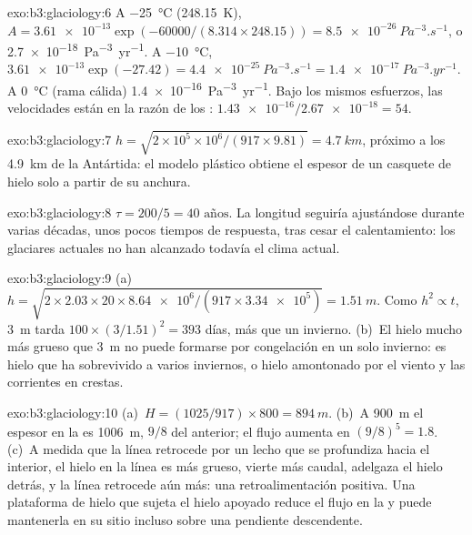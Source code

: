 \begin{solution}{exo:b3:glaciology:6}
A \qty{-25}{\celsius} (\qty{248.15}{K}), $A = \num{3.61e-13}\exp(-60000/
(8.314\times248.15)) = \qty{8.5e-26}{Pa^{-3}.s^{-1}}$, o
\qty{2.7e-18}{Pa^{-3}.yr^{-1}}. A \qty{-10}{\celsius}, $\num{3.61e-13}
\exp(-27.42) = \qty{4.4e-25}{Pa^{-3}.s^{-1}} = \qty{1.4e-17}{Pa^{-3}.yr^{-1}}$.
A \qty{0}{\celsius} (rama cálida) \qty{1.4e-16}{Pa^{-3}.yr^{-1}}. Bajo
los mismos esfuerzos, las velocidades están en la razón de los :
$\num{1.43e-16}/\num{2.67e-18} = 54$.
\end{solution}

\begin{solution}{exo:b3:glaciology:7}
$h = \sqrt{2\times10^5\times10^6/(917\times9.81)} = \qty{4.7}{km}$, próximo a
los \qty{4.9}{km} de la Antártida: el modelo plástico obtiene el espesor de un
casquete de hielo solo a partir de su anchura.
\end{solution}

\begin{solution}{exo:b3:glaciology:8}
$\tau = 200/5 = \num{40}\text{ años}$. La longitud seguiría ajustándose durante
varias décadas, unos pocos tiempos de respuesta, tras cesar el calentamiento: los glaciares actuales
no han alcanzado todavía el clima actual.
\end{solution}

\begin{solution}{exo:b3:glaciology:9}
(a)~$h = \sqrt{2\times2.03\times20\times\num{8.64e6}/(917\times\num{3.34e5})}
= \qty{1.51}{m}$. Como $h^2 \propto t$, \qty{3}{m} tarda $100\times
(3/1.51)^2 = 393$ días, más que un invierno. (b)~El hielo mucho más grueso que
\qty{3}{m} no puede formarse por congelación en un solo invierno: es hielo que ha
sobrevivido a varios inviernos, o hielo amontonado por el viento y las corrientes en crestas.
\end{solution}

\begin{solution}{exo:b3:glaciology:10}
(a)~$H = (1025/917)\times800 = \qty{894}{m}$. (b)~A \qty{900}{m} el
espesor en la  es \qty{1006}{m}, $9/8$ del anterior; el flujo
aumenta en $(9/8)^5 = 1.8$. (c)~A medida que la línea retrocede por un lecho que se profundiza
hacia el interior, el hielo en la línea es más grueso, vierte más caudal, adelgaza el hielo
detrás, y la línea retrocede aún más: una retroalimentación positiva. Una plataforma de hielo
que sujeta el hielo apoyado reduce el flujo en la  y puede
mantenerla en su sitio incluso sobre una pendiente descendente.
\end{solution}

